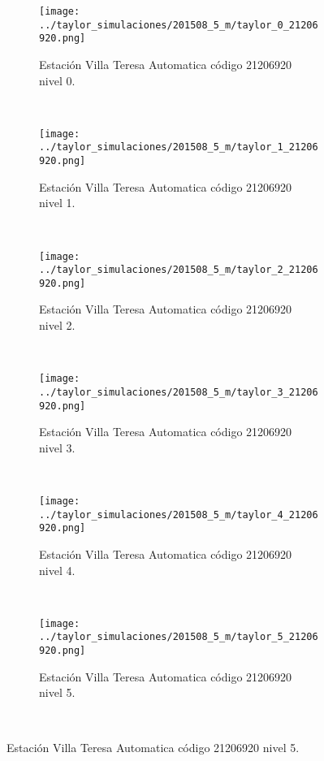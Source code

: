\begin{figure}[H]
\centering
\begin{subfigure}[normla]{0.4\textwidth}
\caption{Estación Villa Teresa Automatica  código 21206920 nivel 0.}
\texttt{[image: ../taylor\_simulaciones/201508\_5\_m/taylor\_0\_21206920.png]}
\end{subfigure}
~
\begin{subfigure}[normla]{0.4\textwidth}
\caption{Estación Villa Teresa Automatica  código 21206920 nivel 1.}
\texttt{[image: ../taylor\_simulaciones/201508\_5\_m/taylor\_1\_21206920.png]}
\end{subfigure}
~
\begin{subfigure}[normla]{0.4\textwidth}
\caption{Estación Villa Teresa Automatica  código 21206920 nivel 2.}
\texttt{[image: ../taylor\_simulaciones/201508\_5\_m/taylor\_2\_21206920.png]}
\end{subfigure}
~
\begin{subfigure}[normla]{0.4\textwidth}
\caption{Estación Villa Teresa Automatica  código 21206920 nivel 3.}
\texttt{[image: ../taylor\_simulaciones/201508\_5\_m/taylor\_3\_21206920.png]}
\end{subfigure}
~
\begin{subfigure}[normla]{0.4\textwidth}
\caption{Estación Villa Teresa Automatica  código 21206920 nivel 4.}
\texttt{[image: ../taylor\_simulaciones/201508\_5\_m/taylor\_4\_21206920.png]}
\end{subfigure}
~
\begin{subfigure}[normla]{0.4\textwidth}
\caption{Estación Villa Teresa Automatica  código 21206920 nivel 5.}
\texttt{[image: ../taylor\_simulaciones/201508\_5\_m/taylor\_5\_21206920.png]}
\end{subfigure}
~
\end{figure}
           
